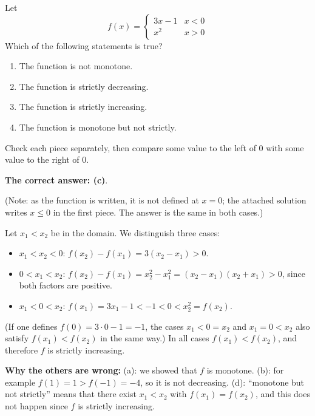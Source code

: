 
\begin{question}
Let
\[
f(x)=\begin{cases}
3x-1 & x<0\\
x^2 & x>0
\end{cases}
\]
Which of the following statements is true?
\begin{enumerate}
  \item The function is not monotone.
  \item The function is strictly decreasing.
  \item The function is strictly increasing.
  \item The function is monotone but not strictly.
\end{enumerate}
\end{question}

\begin{hint}
Check each piece separately, then compare some value to the left of 0 with some value to the right of 0.
\end{hint}

\begin{solution}
\textbf{The correct answer: (c)}.

(Note: as the function is written, it is not defined at $x=0$; the attached solution writes $x\le0$ in the first piece. The answer is the same in both cases.)

Let $x_1<x_2$ be in the domain. We distinguish three cases:
\begin{itemize}
  \item $x_1<x_2<0$: $f(x_2)-f(x_1)=3(x_2-x_1)>0$.
  \item $0<x_1<x_2$: $f(x_2)-f(x_1)=x_2^2-x_1^2=(x_2-x_1)(x_2+x_1)>0$, since both factors are positive.
  \item $x_1<0<x_2$: $f(x_1)=3x_1-1<-1<0<x_2^2=f(x_2)$.
\end{itemize}
(If one defines $f(0)=3\cdot0-1=-1$, the cases $x_1<0=x_2$ and $x_1=0<x_2$ also satisfy $f(x_1)<f(x_2)$ in the same way.)
In all cases $f(x_1)<f(x_2)$, and therefore $f$ is strictly increasing.

\textbf{Why the others are wrong:} (a): we showed that $f$ is monotone. (b): for example $f(1)=1>f(-1)=-4$, so it is not decreasing. (d): ``monotone but not strictly'' means that there exist $x_1<x_2$ with $f(x_1)=f(x_2)$, and this does not happen since $f$ is strictly increasing.
\end{solution}
